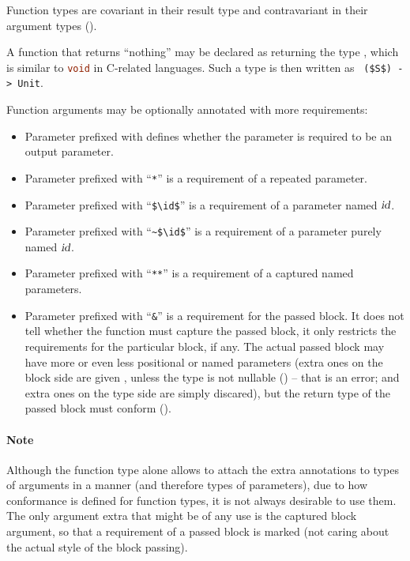 Function types are covariant in their result type and contravariant in their argument types ().

A function that returns ``nothing'' may be declared as returning the type , which is similar to \lstinline[language=C]!void! in C-related languages. Such a type is then written as ~\lstinline!($S$) -> Unit!. 

Function arguments may be optionally annotated with more requirements: 
\begin{itemize}
\item
Parameter prefixed with  defines whether the parameter is required to be an output parameter. 

\item
Parameter prefixed with ``\lstinline!*!'' is a requirement of a repeated parameter. 

\item 
Parameter prefixed with ``\lstinline!$\id$!'' is a requirement of a parameter named $\mbox{\sl id}$.

\item 
Parameter prefixed with ``\lstinline!~$\id$!'' is a requirement of a parameter purely named $\mbox{\sl id}$.

\item 
Parameter prefixed with ``\lstinline!**!'' is a requirement of a captured named parameters. 

\item
Parameter prefixed with ``\lstinline!&!'' is a requirement for the passed block. It does not tell whether the function must capture the passed block, it only restricts the requirements for the particular block, if any. The actual passed block may have more or even less positional or named parameters (extra ones on the block side are given , unless the type is not nullable () -- that is an error; and extra ones on the type side are simply discared), but the return type of the passed block must conform ().
\end{itemize}

\paragraph{Note}
Although the function type alone allows to attach the extra annotations to types of arguments in a  manner (and therefore types of parameters), due to how conformance is defined for function types, it is not always desirable to use them. The only argument extra that might be of any use is the captured block argument, so that a requirement of a passed block is marked (not caring about the actual style of the block passing). 

